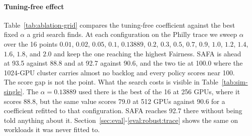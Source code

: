 \documentclass{ieeetj}
\begin{document}
\begin{table}[htb!]
\centering
\caption{Grid-searched fixed $\alpha$ versus the tuning-free coefficient}
\label{tab:ablation-grid}
\footnotesize
{}
\end{table}

\paragraph{Tuning-free effect}
Table~\ref{tab:ablation-grid} compares the tuning-free coefficient against the best fixed $\alpha$ a grid search finds. At each configuration on the Philly trace we sweep $\alpha$ over the 16 points $0.01$, $0.02$, $0.05$, $0.1$, $0.13889$, $0.2$, $0.3$, $0.5$, $0.7$, $0.9$, $1.0$, $1.2$, $1.4$, $1.6$, $1.8$, and $2.0$ and keep the one reaching the highest Fairness. SAFA is ahead at 93.5 against 88.8 and at 92.7 against 90.6, and the two tie at 100.0 where the 1024-GPU cluster carries almost no backlog and every policy scores near 100. The score gap is not the point. What the search costs is visible in Table~\ref{tab:sim-single}. The $\alpha=0.13889$ used there is the best of the 16 at 256 GPUs, where it scores 88.8, but the same value scores 79.0 at 512 GPUs against 90.6 for a coefficient refitted to that configuration. SAFA reaches 92.7 there without being told anything about it. Section~\ref{sec:eval}-\ref{eval:robust:trace} shows the same on workloads it was never fitted to.
\end{document}
